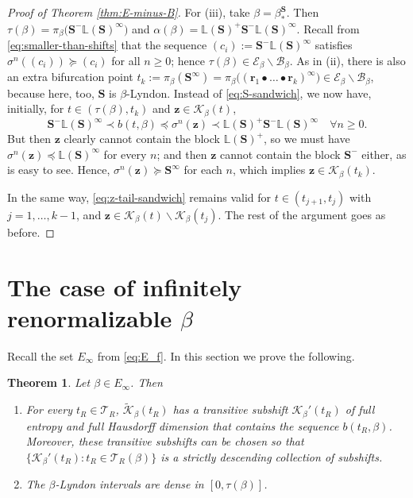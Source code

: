 \documentclass[11pt]{amsart}
\newtheorem{theorem}{Theorem}[section]
\theoremstyle{definition}
\theoremstyle{remark}
\numberwithin{equation}{section}
\renewcommand{\L}{\ensuremath{\mathbb{L}}}
\newcommand{\BB}{\mathscr{B}}
\newcommand{\EE}{\mathscr{E}}
\newcommand{\Kt}{\widetilde{\mathcal{K}}}
\newcommand{\cs}{ {\mathbf{S}}}
\renewcommand{\r}{ {\mathbf{r}}}
\newcommand{\z}{\mathbf{z}}
\newcommand{\f}{\infty}
\newcommand{\al}{\alpha}
\newcommand{\lle}{\preccurlyeq}
\newcommand{\lge}{\succcurlyeq}
\newcommand{\si}{\sigma}
\newcommand{\La}{\Lambda}
\begin{document}
\begin{proof}[Proof of Theorem \ref{thm:E-minus-B}]
{For (iii), take $\beta=\beta_*^\cs$. Then $\tau(\beta)=\pi_\beta\big(\cs^- \L(\cs)^\f\big)$ and $\al(\beta)=\L(\cs)^+\cs^-\L(\cs)^\f$. Recall from \eqref{eq:smaller-than-shifts} that the sequence $(c_i):=\cs^- \L(\cs)^\f$ satisfies $\si^n((c_i))\lge (c_i)$ for all $n\geq 0$; hence $\tau(\beta)\in \EE_\beta\backslash\BB_\beta$. As in (ii), there is also an extra bifurcation point $t_k:=\pi_\beta(\cs^\f)=\pi_\beta\big((\r_1\bullet\dots\bullet\r_k)^\f\big)\in \EE_\beta\backslash\BB_\beta$, because here, too, $\cs$ is $\beta$-Lyndon. Instead of \eqref{eq:S-sandwich}, we now have, initially, for $t\in(\tau(\beta),t_k)$ and $\z\in\mathcal{K}_\beta(t)$,
\[
\cs^-\L(\cs)^\f\prec b(t,\beta)\lle \sigma^n(\z)\prec \L(\cs)^+\cs^-\L(\cs)^\f \quad\forall n\geq 0.
\]
But then $\z$ clearly cannot contain the block $\L(\cs)^+$, so we must have $\si^n(\z)\lle \L(\cs)^\f$ for every $n$; and then $\z$ cannot contain the block $\cs^-$ either, as is easy to see. Hence, $\si^n(\z)\lge\cs^\f$ for each $n$, which implies $\z\in\mathcal{K}_\beta(t_k)$.

In the same way, \eqref{eq:z-tail-sandwich} remains valid for $t\in(t_{j+1},t_j)$ with $j=1,\dots,k-1$, and $\z\in \mathcal{K}_\beta(t)\backslash \mathcal{K}_\beta(t_j)$. The rest of the argument goes as before.
}
\end{proof}


\section{The case of infinitely renormalizable $\beta$} \label{sec:E-infinity}

Recall the set $E_\f$ from \eqref{eq:E_f}. In this section we prove the following.


\begin{theorem} \label{thm:infinitely-Farey}
Let $\beta\in E_\f$. Then
\begin{enumerate}[{\rm(i)}]
\item For every $t_R\in\mathcal{T}_R$, $\Kt_\beta(t_R)$ has a transitive subshift $\mathcal{K}_\beta'(t_R)$ of full entropy and full Hausdorff dimension that contains the sequence $b(t_R,\beta)$. Moreover, these transitive subshifts can be chosen so that $\{\mathcal{K}_\beta'(t_R): t_R\in\mathcal{T}_R(\beta)\}$ is a strictly descending collection of subshifts.
\item The $\beta$-Lyndon intervals are dense in $[0,\tau(\beta)]$.
\end{enumerate}
\end{theorem}
\end{document}

